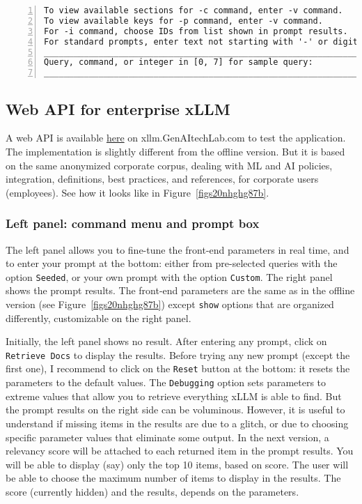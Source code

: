 \documentclass[10pt]{article}
\begin{document}
{\begin{lstlisting}[numbers=left,basicstyle=\ttfamily\footnotesize, frame=none]
To view available sections for -c command, enter -v command.
To view available keys for -p command, enter -v command.
For -i command, choose IDs from list shown in prompt results.
For standard prompts, enter text not starting with '-' or digit.
____________________________________________________________________
Query, command, or integer in [0, 7] for sample query:
____________________________________________________________________

\end{lstlisting}
\normalsize



\subsection{Web API for enterprise xLLM}

A web API is available \href{https://xllm.genaitechlab.com/}{here} on xllm.GenAItechLab.com to test the application. 
The implementation is slightly different from the offline version. But it is based on the same anonymized corporate corpus,
 dealing with ML and AI policies, integration, definitions, best practices, and references, for corporate users (employees). See how it looks like in Figure~\ref{figs20nhghg87b}.

\subsubsection{Left panel: command menu and prompt box}

 The left panel allows you to fine-tune the front-end parameters in real time,
and to enter your prompt at the bottom: either from pre-selected queries with the option \texttt{Seeded}, or your own prompt with the option
 \texttt{Custom}. The right panel shows the prompt results. The front-end parameters are the same as in the offline version
(see Figure~\ref{figs20nhghg87b}) except \texttt{show} options that are organized differently, customizable on the right panel.

Initially, the left panel shows no result. After entering any prompt, click on \texttt{Retrieve Docs} to display the results.  
Before trying any new prompt (except the first one), I recommend to click on the \texttt{Reset} button at the bottom: it resets the
 parameters to the default values. The \texttt{Debugging} option sets parameters to extreme values that allow you to retrieve
 everything xLLM is able to find. But the prompt results on the right side can be voluminous. However, it is useful to understand if missing items in the results
 are due to a glitch, or due to choosing specific parameter values that eliminate some output. In the next version, a 
\textcolor{index}{relevancy score}
 will be attached to each returned item in the prompt results. You will be able to display (say) only the top 10 items, based on score. The user will be able to choose the maximum number of items to display in the results. The score (currently hidden) 
 and the results, depends on the parameters.   
  
}
\end{document}
